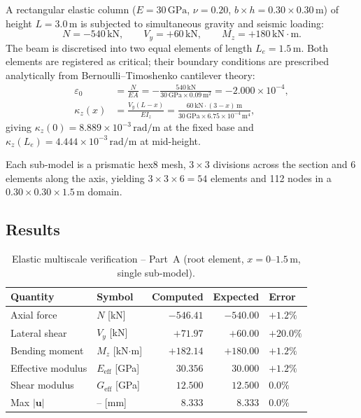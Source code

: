 A rectangular elastic column ($E = 30\,\text{GPa}$, $\nu = 0.20$,
$b \times h = 0.30 \times 0.30\,\text{m}$) of height $L = 3.0\,\text{m}$
is subjected to simultaneous gravity and seismic loading:
%
\begin{equation}
  N   = -540\,\text{kN}, \qquad
  V_y =  +60\,\text{kN}, \qquad
  M_z = +180\,\text{kN}\cdot\text{m}.
\end{equation}
%
The beam is discretised into two equal elements of length
$L_e = 1.5\,\text{m}$.  Both elements are registered as critical;
their boundary conditions are prescribed analytically from
Bernoulli--Timoshenko cantilever theory:
%
\begin{align}
  \varepsilon_0 &= \frac{N}{EA} = -\frac{540\,\text{kN}}
                   {30\,\text{GPa}\times 0.09\,\text{m}^2}
                 = -2.000 \times 10^{-4}, \\[4pt]
  \kappa_z(x)   &= \frac{V_y(L-x)}{EI_z}
                 = \frac{60\,\text{kN}\cdot(3-x)\,\text{m}}
                   {30\,\text{GPa}\times 6.75\times10^{-4}\,\text{m}^4},
\end{align}
%
giving $\kappa_z(0) = 8.889\times10^{-3}\,\text{rad/m}$ at the fixed base
and $\kappa_z(L_e) = 4.444\times10^{-3}\,\text{rad/m}$ at mid-height.

Each sub-model is a prismatic hex8 mesh, $3\times3$ divisions across the
section and 6 elements along the axis, yielding $3\times3\times6 = 54$
elements and 112 nodes in a $0.30\times0.30\times1.5\,\text{m}$ domain.

\subsection{Results}

\begin{table}[htb]
\centering
\caption{Elastic multiscale verification -- Part~A (root element,
         $x = 0$--$1.5\,\text{m}$, single sub-model).}
\label{tab:elastic_results}
\begin{tabular}{llrrl}
\hline
Quantity          & Symbol               & Computed        & Expected & Error \\
\hline
Axial force       & $N$             [kN] &  $-546.41$      & $-540.00$ & $+1.2\%$ \\
Lateral shear     & $V_y$           [kN] &  $+71.97$       &  $+60.00$ & $+20.0\%$ \\
Bending moment    & $M_z$ [kN$\cdot$m]  &  $+182.14$      & $+180.00$ & $+1.2\%$ \\
Effective modulus & $E_\text{eff}$ [GPa] &  $30.356$       & $30.000$  & $+1.2\%$ \\
Shear modulus     & $G_\text{eff}$ [GPa] &  $12.500$       & $12.500$  & $0.0\%$ \\
Max $|\mathbf{u}|$ & --             [mm] &  $8.333$        & $8.333$   & $0.0\%$ \\
\hline
\end{tabular}
\end{table}

